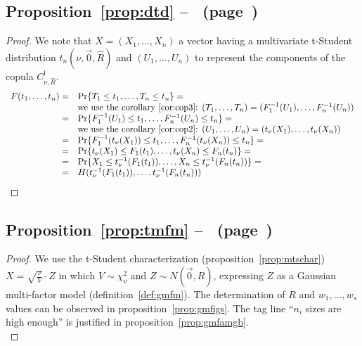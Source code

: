 \documentclass[11pt,fleqn]{book} %
\begin{document}
\subsection{Proposition~\ref{prop:dtd} --~ (page~\pageref{prop:dtd})}
\begin{proof}
	We note that $X=(X_1,\dots,X_n)$ a vector having a multivariate t-Student
	distribution $t_n(\nu,\vec{0},\widehat{R})$ and $(U_1,\dots,U_n)$ to 
	represent the components of the copula $C_{\nu,\widehat{R}}^{\text{t}}$.
	\begin{displaymath}
		\begin{array}{rl}
			F(t_1,\dots,t_n) = & \Pr\{ T_1 \le t_1 , \dots, T_n \le t_n \} = \\
			                   & \text{we use the corollary~\ref{cor:cop3}: }
			(T_1,\dots,T_n) = (F_1^{-1}(U_1),\dots,F_n^{-1}(U_n)) \\
			=                  & \Pr\{ F_1^{-1}(U_1) \le t_1 , \dots , F_n^{-1}(U_n) \le t_n \} = \\
			                   & \text{we use the corollary~\ref{cor:cop2}: }
			(U_1,\dots,U_n) = (t_\nu(X_1),\dots,t_\nu(X_n)) \\
			=                  & \Pr\{ F_1^{-1}(t_\nu(X_1)) \le t_1 , \dots , F_n^{-1}(t_\nu(X_n)) \le t_n \} = \\
			=                  & \Pr\{ t_\nu(X_1) \le F_1(t_1), \dots , t_\nu(X_n) \le F_n(t_n) \} = \\
			=                  & \Pr\{ X_1 \le t_\nu^{-1}(F_1(t_1)), \dots , X_n \le t_\nu^{-1}(F_n(t_n)) \} = \\
			=                  & H(t_\nu^{-1}(F_1(t_1)), \dots, t_\nu^{-1}(F_n(t_n))) \\
		\end{array}
	\end{displaymath}
\end{proof}

\subsection{Proposition~\ref{prop:tmfm} --~ (page~\pageref{prop:tmfm})}
\begin{proof}
	We use the t-Student characterization (proposition~\ref{prop:mtschar})
	$X = \sqrt{\frac{\nu}{V}} \cdot Z$ in which $V \sim \chi_{\nu}^2$ and 
	$Z \sim N(\vec{0},\widehat{R})$, expressing $Z$ as a Gaussian multi-factor model 
	(definition~\ref{def:gmfm}). The determination of $R$ and $w_1,\dots,w_s$
	values can be observed in proposition~\ref{prop:gmfigs}. The tag line 
	``$n_i$ sizes are high enough'' is justified in 
	proposition~\ref{prop:gmfamgb}.
	\\
\end{proof}
\end{document}
